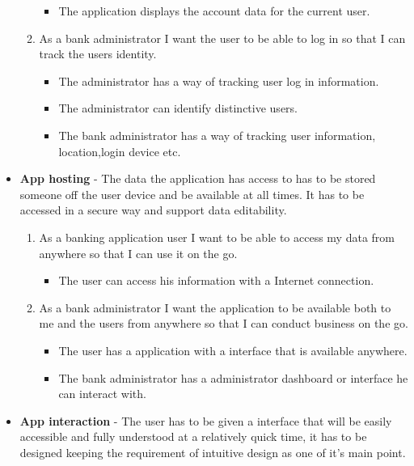 \begin{itemize}
\begin{enumerate}
\begin{itemize}
                \item The application displays the account data for the current user.
            \end{itemize}
        \item As a bank administrator I want the user to be able to log in so that I can track the users identity.
            \begin{itemize}
                \item The administrator has a way of tracking user log in information.
                \item The administrator can identify distinctive users.
                \item The bank administrator has a way of tracking user information, location,login device etc.
            \end{itemize}
        \end{enumerate}
    \item  \textbf{App hosting} - The data the application has access to has to be stored someone off the user device and be available at all times. It has to be accessed in a secure way and support data editability.
        \begin{enumerate}
        \item As a banking application user I want to be able to access my data from anywhere so that I can use it on the go.
            \begin{itemize}
                \item The user can access his information with a Internet connection.
            \end{itemize}
        \item As a bank administrator I want the application to be available both to me and the users from anywhere so that I can conduct business on the go.
            \begin{itemize}
                \item The user has a application with a interface that is available anywhere.
                \item The bank administrator has a administrator dashboard or interface he can interact with.
            \end{itemize}
        \end{enumerate}
    \item  \textbf{App interaction} - The user has to be given a interface that will be easily accessible and fully understood at a relatively quick time, it has to be designed keeping the requirement of intuitive design as one of it's main point.

\end{itemize}
